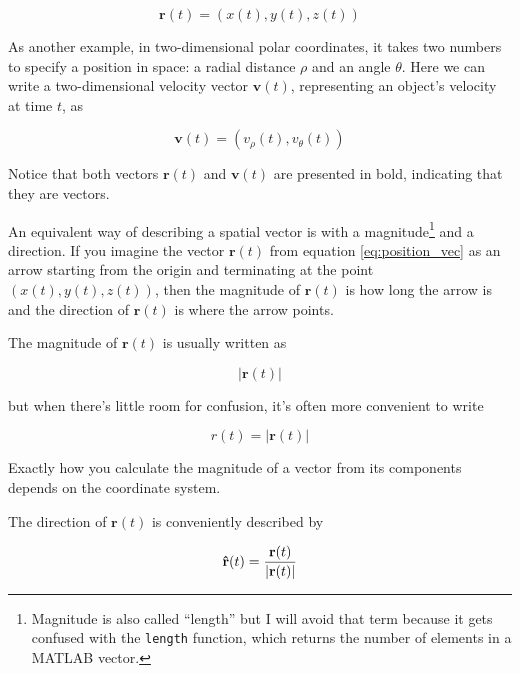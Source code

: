 \documentclass[
]{book}
\renewcommand{\vec}[1]{\bm{\mathbf{#1}}}
\newcommand{\uveci}{{\bm{\hat{\textnormal{\bfseries\i}}}}}
\newcommand{\uvecj}{{\bm{\hat{\textnormal{\bfseries\j}}}}}
\newcommand{\uvec}[1]{%
    \ifthenelse{\equal{#1}{i}}%
        {\uveci}{%
    \ifthenelse{\equal{#1}{j}}%
        {\uvecj}{%
    {\bm{\hat{\mathbf{#1}}}}%
}}}
\newcommand{\norm}[1]{\lvert #1 \rvert}
\begin{document}
\begin{equation}\label{eq:position_vec}
    \vec{r}(t) = (x(t), y(t), z(t))
\end{equation}

As another example, in two-dimensional polar coordinates, it takes two
numbers to specify a position in space: a radial distance $\rho$ and an
angle $\theta$. Here we can write a two-dimensional velocity vector
$\vec{v}(t)$, representing an object's velocity at time $t$, as

\begin{equation}
    \vec{v}(t) = (v_\rho(t),v_\theta(t))
\end{equation}

Notice that both vectors $\vec{r}(t)$ and $\vec{v}(t)$ are presented in bold,
indicating that they are vectors.

An equivalent way of describing a spatial vector is with a magnitude\footnote{
    Magnitude is also called ``length'' but I will avoid that term
    because it gets confused with the {\tt length} function, which
    returns the number of elements in a MATLAB vector.} and a
direction. If
you imagine the vector $\vec{r}(t)$ from equation
\eqref{eq:position_vec} as an arrow starting from the origin and
terminating at the point $(x(t),y(t),z(t))$, then the magnitude of
$\vec{r}(t)$ is how long the arrow is and the direction of $\vec{r}(t)$
is where the arrow points.

The magnitude of $\vec{r}(t)$ is usually written as

\begin{equation}\label{eq:vec_u_mag1}
    \norm{\vec{r}(t)}
\end{equation}

but when there's little room for confusion, it's often more convenient
to write

\begin{equation}\label{eq:vec_u_mag2}
    r(t) = \norm{\vec{r}(t)}
\end{equation}

Exactly how you calculate the magnitude of a vector from its components depends
on the coordinate system.

The direction of $\vec{r}(t)$ is conveniently described by

\begin{equation}\label{eq:vec_u_unit}
    \uvec{r}(t) = \frac{\vec{r}(t)}{\norm{\vec{r}(t)}}
\end{equation}
\end{document}
